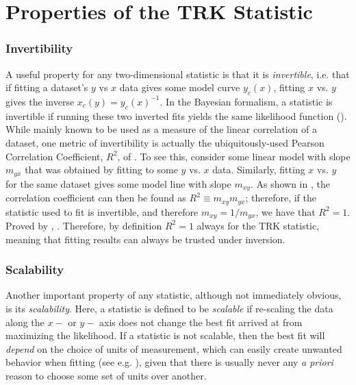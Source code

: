 \chapter{Properties of the TRK Statistic}
\label{cha:properties}

\subsection{Invertibility}
\label{sec:invertibility}
A useful property for any two-dimensional statistic is that it is \textit{invertible}, i.e. that if fitting a dataset's $y$ vs $x$ data gives some model curve $y_c(x)$, fitting $x$ vs. $y$ gives the inverse $x_c(y)=y_c(x)^{-1}$. In the Bayesian formalism, a statistic is invertible if running these two inverted fits yields the same likelihood function (\textcite{trotter}). While mainly known to be used as a measure of the linear correlation of a dataset, one metric of invertibility is actually the ubiquitously-used Pearson Correlation Coefficient, $R^2$, of \textcite{pearson1896vii}. To see this, consider some linear model with slope $m_{yx}$ that was obtained by fitting to some $y$ vs. $x$ data. Similarly, fitting $x$ vs. $y$ for the same dataset gives some model line with slope $m_{xy}$. As shown in \textcite{trotter}, the correlation coefficient can then be found as $R^2\equiv m_{xy}m_{yx}$; therefore, if the statistic used to fit is invertible, and therefore $m_{xy}=1/m_{yx}$, we have that $R^2=1$. Proved by \textcite{trotter}, \textcite{the TRK statistic is completely invertible}. Therefore, by definition $R^2=1$ always for the TRK statistic, meaning that fitting results can always be trusted under inversion.

\subsection{Scalability}
\label{sec:scalability}
Another important property of any statistic, although not immediately obvious, is its \textit{scalability}. Here, a statistic is defined to be \textit{scalable} if re-scaling the data along the $x-$ or $y-$ axis does not change the best fit arrived at from maximizing the likelihood. If a statistic is not scalable, then the best fit will \textit{depend} on the choice of units of measurement, which can easily create unwanted behavior when fitting (see e.g. \textcite{trotter}), given that there is usually never any \textit{a priori} reason to choose some set of units over another.


